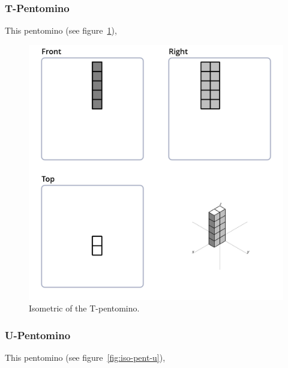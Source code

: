\subsubsection{T-Pentomino}
This pentomino (see figure~\ref{fig:iso-pent-t}),


\begin{figure}
	\centering
	\includegraphics[scale=0.3]{iso_diagrams/o.png}
	\caption{Isometric of the T-pentomino.}
  \label{fig:iso-pent-t}
\end{figure}
\subsubsection{U-Pentomino}
This pentomino (see figure~\ref{fig:iso-pent-u}),


